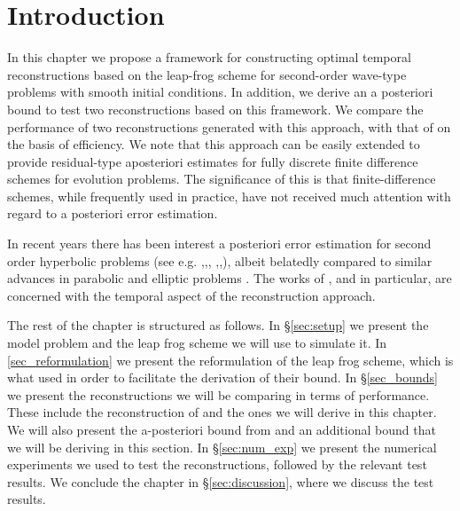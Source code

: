 \documentclass[12pt,a4paper]{article}
\numberwithin{equation}{section}
\theoremstyle{definition}
\begin{document}
\section{Introduction}\label{sec_intro}



In this chapter we propose a framework for constructing optimal temporal reconstructions based on the leap-frog scheme for second-order wave-type problems with smooth initial conditions.  In addition, we derive an a posteriori bound to test two reconstructions based on this framework.  We compare the performance of two reconstructions generated with this approach, with that of \cite{georgoulis2016posteriori} on the basis of efficiency.  We note that this approach can be easily extended to provide residual-type aposteriori estimates for fully discrete finite difference schemes for evolution problems.  The significance of this is that finite-difference schemes, while frequently used in practice, have not received much attention with regard to a posteriori error estimation.

In recent years there has been interest a posteriori error estimation for second order hyperbolic problems (see e.g. \cite{bernardi2005time},\cite{georgoulis2013posteriori},\cite{georgoulis2016posteriori}, \cite{gorynina2018elements},\cite{gorynina2019time},\cite{gorynina2019easily}), albeit belatedly compared to similar advances in parabolic and elliptic problems . The works of \cite{georgoulis2016posteriori}, \cite{gorynina2019time} and  \cite{gorynina2019easily} in particular, are concerned with the temporal aspect of the reconstruction approach.


The rest of the chapter is structured as follows.  In \S \ref{sec:setup} we present the model problem and the leap frog scheme we will use to simulate it.  In \ref{sec_reformulation} we present the reformulation of the leap frog scheme, which is what  \cite{georgoulis2016posteriori} used in order to facilitate the derivation of their bound.  In \S \ref{sec_bounds} we present the reconstructions we will be comparing in terms of performance.  These include the reconstruction  of \cite{georgoulis2016posteriori} and the ones we will derive in this chapter. We will also present the a-posteriori bound from \cite{georgoulis2016posteriori} and an additional bound that we will be deriving in this section.  In \S \ref{sec:num_exp} we present the numerical experiments we used to test the reconstructions, followed by the relevant test results.  We conclude the chapter in \S \ref{sec:discussion}, where we  discuss the test results.
\end{document}
